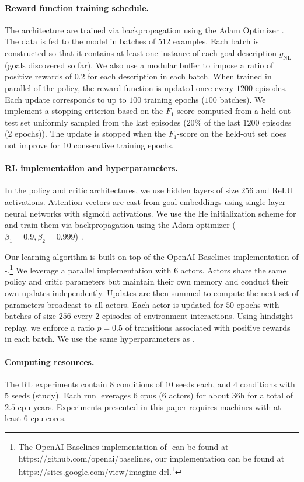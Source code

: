 \paragraph{Reward function training schedule.} The architecture are trained via backpropagation using the Adam Optimizer \cite{kingma2014adam}. The data is fed to the model in batches of $512$ examples. Each batch is constructed so that it contains at least one instance of each goal description $g_\text{NL}$ (goals discovered so far). We also use a modular buffer to impose a ratio of positive rewards of $0.2$ for each description in each batch. When trained in parallel of the policy, the reward function is updated once every $1200$ episodes. Each update corresponds to up to $100$ training epochs ($100$ batches). We implement a stopping criterion based on the $F_1$-score computed from a held-out test set uniformly sampled from the last episodes ($20\%$ of the last $1200$ episodes (2 epochs)). The update is stopped when the $F_1$-score on the held-out set does not improve for $10$ consecutive training epochs.

\paragraph{RL implementation and hyperparameters.} In the policy and critic architectures, we use hidden layers of size $256$ and ReLU activations. Attention vectors are cast from goal embeddings using single-layer neural networks with sigmoid activations. We use the He initialization scheme for \cite{he} and train them via backpropagation using the Adam optimizer ($\beta_1=0.9, \beta_2=0.999$) \cite{kingma2014adam}.

Our learning algorithm is built on top of the OpenAI Baselines implementation of \her-\ddpg.\footnote{ The OpenAI Baselines implementation of \her-\ddpg can be found at https://github.com/openai/baselines, our implementation can be found at \url{https://sites.google.com/view/imagine-drl}.\footnote{Link to our Github repository will be added in the final version.}} We leverage a parallel implementation with $6$ actors. Actors share the same policy and critic parameters but maintain their own memory and conduct their own updates independently. Updates are then summed to compute the next set of parameters broadcast to all actors. Each actor is updated for $50$ epochs with batches of size $256$ every $2$ episodes of environment interactions. Using hindsight replay, we enforce a ratio $p=0.5$ of transitions associated with positive rewards in each batch. We use the same hyperparameters as \citet{plappert2018multi}. 



\paragraph{Computing resources.}
The RL experiments contain $8$ conditions of $10$ seeds each, and $4$ conditions with $5$ seeds (\SP study). Each run leverages $6$ cpus ($6$ actors) for about $36$h for a total of $2.5$ cpu years. Experiments presented in this paper requires machines with at least $6$ cpu cores.

